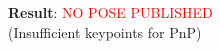 \documentclass[serif, aspectratio=169, 9pt]{beamer}
\begin{document}
\begin{frame}
\begin{columns}
\begin{figure}
\begin{itemize}
            \end{itemize}
            \vspace{0.2em}
            \textbf{Result}: \textcolor{red}{NO POSE PUBLISHED}\\
            \small (Insufficient keypoints for PnP)
        \end{figure}
    \end{columns}
\end{frame}
\end{document}
